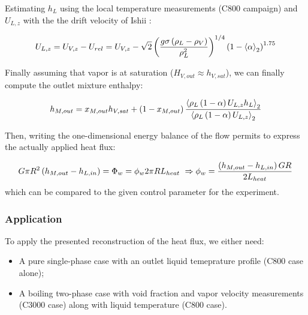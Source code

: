 \npar


Estimating $h_{L}$ using the local temperature measurements (C800 campaign) and $U_{L,z}$ with the the drift velocity of Ishii \cite{ishii_one-dimensional_1977}:

\begin{equation}
U_{L,z} = U_{V,z} - U_{rel} = U_{V,z} - \sqrt{2} \left( \frac{g \sigma \left( \rho_{L}-\rho_{V} \right)}{\rho_{L}^{2}} \right)^{1/4} \left( 1-\left< \alpha \right>_{2} \right)^{1.75}
\label{eq:drift_debora}
\end{equation}

Finally assuming that vapor is at saturation ($H_{V,out}\approx h_{V,sat}$), we can finally compute the outlet mixture enthalpy:

\begin{equation}
h_{M,out} = x_{M,out} h_{V,sat} + \left( 1-x_{M,out} \right) \frac{\left< \rho_{L}\left( 1-\alpha \right)U_{L,z}h_{L} \right>_{2}}{\left< \rho_{L}\left( 1-\alpha \right)U_{L,z} \right>_{2}}
\label{eq:hM_debora}
\end{equation}

%

Then, writing the one-dimensional energy balance of the flow permits to express the actually applied heat flux: 

\begin{equation}
G \pi R^{2} \left( h_{M,out} - h_{L,in} \right) = \Phi_{w} = \phi_{w} 2\pi R L_{heat} \ \Rightarrow \phi_{w} = \frac{\left( h_{M,out}-h_{L,in} \right)GR}{2L_{heat}}
\end{equation}
which can be compared to the given control parameter for the experiment.

\subsubsection{Application}

To apply the presented reconstruction of the heat flux, we either need: 

\begin{itemize}
\item A pure single-phase case with an outlet liquid temeprature profile (C800 case alone);
\item A boiling two-phase case with void fraction and vapor velocity measurements (C3000 case) along with liquid temperature (C800 case).
\end{itemize}

